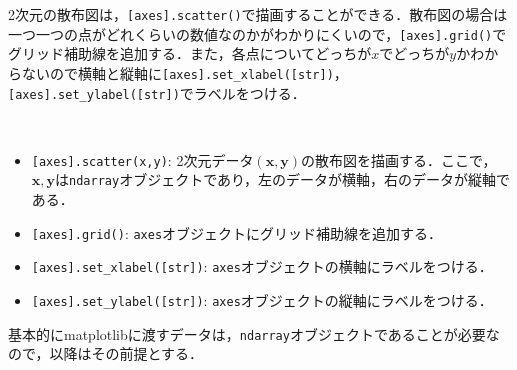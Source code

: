 2次元の散布図は，\texttt{[axes].scatter()}で描画することができる．散布図の場合は一つ一つの点がどれくらいの数値なのかがわかりにくいので，\texttt{[axes].grid()}でグリッド補助線を追加する．また，各点についてどっちが$x$でどっちが$y$かわからないので横軸と縦軸に\texttt{[axes].set\_xlabel([str])}，\texttt{[axes].set\_ylabel([str])}でラベルをつける．
\begin{gram}　
\begin{itemize}
\item \texttt{[axes].scatter(x,y)}: 2次元データ$(\bm{x},\bm{y})$の散布図を描画する．ここで，$\bm{x},\bm{y}$は\texttt{ndarray}オブジェクトであり，左のデータが横軸，右のデータが縦軸である．
\item \texttt{[axes].grid()}: \texttt{axes}オブジェクトにグリッド補助線を追加する．
\item \texttt{[axes].set\_xlabel([str])}: \texttt{axes}オブジェクトの横軸にラベルをつける．
\item \texttt{[axes].set\_ylabel([str])}: \texttt{axes}オブジェクトの縦軸にラベルをつける．
\end{itemize}
\end{gram}


\begin{rem}
基本的にmatplotlibに渡すデータは，\texttt{ndarray}オブジェクトであることが必要なので，以降はその前提とする．
\end{rem}

\begin{cod}[\texttt{fig2.py}]　
}]{code/fig2.py}
\vspace{-19pt}
\begin{figure}[H]
\begin{center}
\framed
\texttt{[image: code/fig2.eps]}
\endframed
\end{center}
\end{figure}
\end{cod}
\vspace{-20pt}